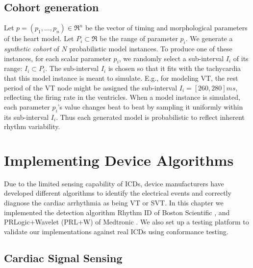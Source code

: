 \subsection{Cohort generation}
\label{sec:cohort generation}
Let $p = (p_1,\ldots,p_n) \in \Re^n$ be the vector of timing and morphological parameters of the heart model.
Let $P_i \subset \Re$ be the range of parameter $p_i$.
We generate a \emph{synthetic cohort} of $N$ probabilistic model instances.
To produce one of these instances, for each scalar parameter $p_i$, we randomly select a sub-interval $I_i$ of its range: $I_i \subset P_i$.
The sub-interval $I_i$ is chosen so that it fits with the tachycardia that this model instance is meant to simulate.
E.g., for modeling VT, the rest period of the VT node might be assigned the sub-interval $I_i = [260, 280]ms$, reflecting the firing rate in the ventricles.
When a model instance is simulated, each parameter $p_i$'s value changes beat to beat by sampling it uniformly within its sub-interval $I_i$.
Thus each generated model is probabilistic to reflect inherent rhythm variability.

\section{Implementing Device Algorithms} 
\label{sec:device models}
Due to the limited sensing capability of ICDs, device manufacturers have developed different algorithms to identify the electrical events and correctly diagnose the cardiac arrhythmia as being VT or SVT.
In this chapter we implemented the detection algorithm Rhythm ID of Boston Scientific \cite{compass,Ellenbogen11_Pacingbook},%
and PRLogic+Wavelet (PRL+W) of Medtronic \cite{Singer,Wavelet}.
We also set up a testing platform to validate our implementations against real ICDs using conformance testing.
\subsection{Cardiac Signal Sensing}
\label{sec:sensing}

